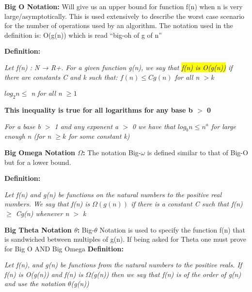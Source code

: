 \documentclass{article}
\begin{document}
\begin{flushleft}
\textbf{Big O Notation:} 
Will give us an upper bound for function f(n) when n is very large/asymptotically. 
This is used extensively to describe the worst case scenario for the number of operations used by an algorithm.
The notation used in the definition is: O(g(n)) which is read “big-oh of g of n”

\textbf{Definition:}\begin{tcolorbox}[enhanced,width=7.5in,center upper,size=fbox,drop shadow southwest,sharp corners]
\textit{Let f(n) : N → R+. For a given function g(n), we say that \hl{f(n) is O(g(n))} if there are constants C and k such that: $f(n) \leq Cg(n)$ for all n $>$k}
\end{tcolorbox}

\begin{tcolorbox}[enhanced,width=2in,center upper,size=fbox,drop shadow southwest,sharp corners]
\textit{$log_2 n \leq$ n for all n $\geq 1$}
\end{tcolorbox}

\textbf{This inequality is true for all logarithms for any base b $>$ 0}
\begin{tcolorbox}[enhanced,width=7.5in,center upper,size=fbox,drop shadow southwest,sharp corners]
\textit{For a base \textit{b} $>$ 1 and any exponent \textit{a} $>$ 0 we have that $log_b n \leq n^a$ for large enough n (for n $\geq k$ for some constant k)}
\end{tcolorbox} 

\vspace{8mm}\textbf{Big Omega Notation $\Omega$:}
The notation Big-$\omega$ is defined similar to that of Big-O but for a lower bound.

\textbf{Definition:}\begin{tcolorbox}[enhanced,width=7.5in,center upper,size=fbox,drop shadow southwest,sharp corners]
\textit{Let f(n) and g(n) be functions on the natural numbers to the positive real numbers. We say that f(n) is $\Omega(g(n))$ if there is a constant C such that f(n) $\geq$ Cg(n) whenever n $>$ k}
\end{tcolorbox}

\vspace{8mm}\textbf{Big Theta Notation $\theta$:}
Big-$\theta$ Notation is used to specify the function f(n) that is sandwiched between multiples of g(n).
If being asked for Theta one must prove for Big O AND Big Omega
\textbf{Definition:}\begin{tcolorbox}[enhanced,width=7.5in,center upper,size=fbox,drop shadow southwest,sharp corners]
\textit{Let f(n), and g(n) be functions from the natural numbers to the positive reals. If f(n) is O(g(n)) and f(n) is $\Omega$(g(n)) then we say that f(n) is of the order of g(n) and use the notation $\theta$(g(n))}
\end{tcolorbox}


\end{flushleft}
\end{document}
